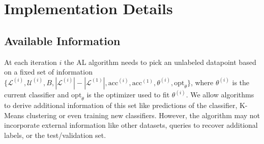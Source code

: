 \documentclass[]{article}
\begin{document}
\section{Implementation Details}

\subsection{Available Information}
At each iteration $i$ the AL algorithm needs to pick an unlabeled datapoint based on a fixed set of information $\{\mathcal{L}^{(i)}, \mathcal{U}^{(i)}, B, |\mathcal{L}^{(i)}|-|\mathcal{L}^{(1)}|, \text{acc}^{(i)}, \text{acc}^{(1)}, \theta^{(i)}, \text{opt}_\theta\}$, where $\theta^{(i)}$ is the current classifier and $\text{opt}_\theta$ is the optimizer used to fit $\theta^{(i)}$.
We allow algorithms to derive additional information of this set like predictions of the classifier, K-Means clustering or even training new classifiers.
However, the algorithm may not incorporate external information like other datasets, queries to recover additional labels, or the test/validation set.

\end{document}
